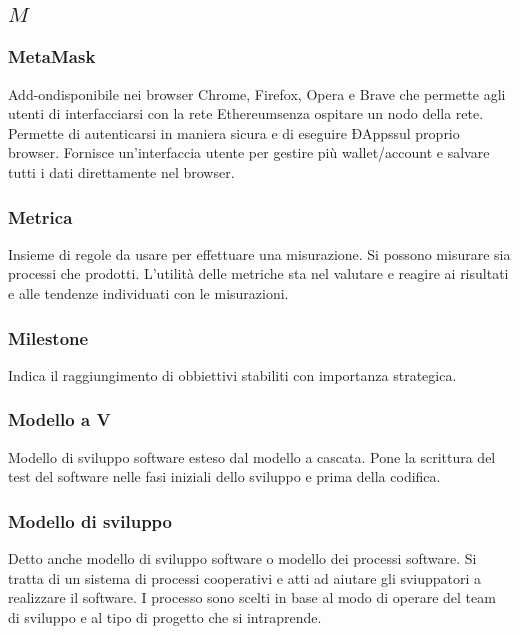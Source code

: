 \subsection*{\quad$M\quad$}
\subsubsection*{MetaMask}
Add-on\glosp disponibile nei browser Chrome, Firefox, Opera e Brave che permette agli utenti di interfacciarsi con la rete Ethereum\glosp senza ospitare un nodo della rete. Permette di autenticarsi in maniera sicura e di eseguire ÐApps\glosp sul proprio browser. Fornisce un'interfaccia utente per gestire più wallet/account e salvare tutti i dati direttamente nel browser. 

\subsubsection*{Metrica}
Insieme di regole da usare per effettuare una misurazione. Si possono misurare sia processi che prodotti. L'utilità delle metriche sta nel valutare e reagire ai risultati e alle tendenze individuati con le misurazioni.

\subsubsection*{Milestone}
Indica il raggiungimento di obbiettivi stabiliti con importanza strategica. 

\subsubsection*{Modello a V}
Modello di sviluppo software esteso dal modello a cascata. Pone la scrittura del test del software nelle fasi iniziali dello sviluppo e prima della codifica.

\subsubsection*{Modello di sviluppo}
Detto anche modello di sviluppo software o modello dei processi software. Si tratta di un sistema di processi cooperativi e atti ad aiutare gli sviuppatori a realizzare il software. I processo sono scelti in base al modo di operare del team di sviluppo e al tipo di progetto che si intraprende.

